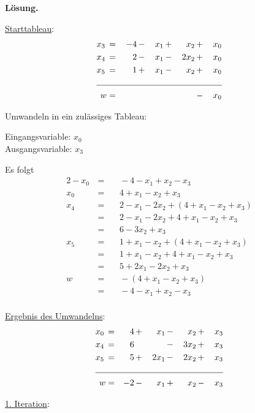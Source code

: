 \documentclass[10pt,a4paper,oneside,ngerman,numbers=noenddot]{scrartcl}
\begin{document}
		\textbf{Lösung.}
		
		\underline{Starttableau}:
		\begin{alignat*}{5}
			x_{3} \,&=&\, -4 \,&-&\, x_{1} \,&+&\, x_{2} \,&+&\, x_{0} \\
			x_{4} \,&=&\, 2 \,&-&\, x_{1} \,&-&\, 2x_{2} \,&+&\, x_{0} \\
			x_{5} \,&=&\, 1 \,&+&\, x_{1} \,&-&\, x_{2} \,&+&\, x_{0} \\ \cline{1 - 9}
			w &=& && && \,&-&\, x_{0}
		\end{alignat*}
		
		Umwandeln in ein zulässiges Tableau:
				
		Eingangsvariable: $x_{0}$\\
		Ausgangsvariable: $x_{3}$
		
		Es folgt
		\begin{alignat*}{2}
			-x_{0} \,&=&&\, -4 - x_{1} + x_{2} - x_{3} \\
			x_{0} \,&=&&\, 4 + x_{1} - x_{2} + x_{3} \\			
			x_{4} \,&=&&\, 2 - x_{1} - 2x_{2} + \left(4 + x_{1} - x_{2} + x_{3}\right) \\			
			&=&&\, 2 - x_{1} - 2x_{2} + 4 + x_{1} - x_{2} + x_{3} \\
			&=&&\, 6 - 3x_{2} + x_{3} \\
			x_{5} \,&=&&\, 1 + x_{1} - x_{2} + \left(4 + x_{1} - x_{2} + x_{3}\right) \\
			&=&&\, 1 + x_{1} - x_{2} + 4 + x_{1} - x_{2} + x_{3} \\
			&=&&\, 5 + 2x_{1} - 2x_{2} + x_{3} \\
			w \,&=&&\, -\left(4 + x_{1} - x_{2} + x_{3}\right) \\
			&=&&\, -4 - x_{1} + x_{2} - x_{3} \\
		\end{alignat*}
		
		\underline{Ergebnis des Umwandelns}:
		\begin{alignat*}{5}
			x_{0} \,&=&\, 4 \,&+&\, x_{1} \,&-&\, x_{2} \,&+&\, x_{3} \\
			x_{4} \,&=&\, 6 \,&& &-&\, 3x_{2} \,&+&\, x_{3} \\
			x_{5} \,&=&\, 5 \,&+&\, 2x_{1} \,&-&\, 2x_{2} \,&+&\, x_{3} \\ \cline{1 - 9}
			w &=& -2 \,&-&\, x_{1} \,&+&\, x_{2} \,&-&\, x_{3}
		\end{alignat*}
		
		\underline{1. Iteration}:
		
\end{document}
